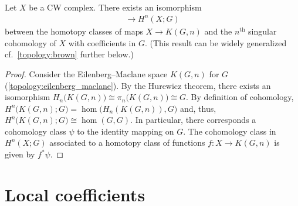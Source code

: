     \begin{property}[Representability]
        Let $X$ be a CW complex. There exists an isomorphism
        \begin{gather}
            [X,K(G,n)]\rightarrow H^n(X;G)
        \end{gather}
        between the homotopy classes of maps $X\rightarrow K(G,n)$ and the $n^{\text{th}}$ singular cohomology of $X$ with coefficients in $G$. (This result can be widely generalized cf.~\cref{topology:brown} further below.)
        \begin{mdframed}[roundcorner=10pt, linecolor=blue, linewidth=1pt]
            \begin{proof}
                Consider the Eilenberg--Maclane space $K(G,n)$ for $G$ (\cref{topology:eilenberg_maclane}). By the Hurewicz theorem, there exists an isomorphism $H_n\bigl(K(G,n)\bigr)\cong\pi_n\bigl(K(G,n)\bigr)\cong G$. By definition of cohomology, $H^n\bigl(K(G,n);G\bigr)=\hom\bigl(H_n(K(G,n)),G\bigr)$ and, thus, $H^n\bigl(K(G,n);G\bigr)\cong\hom(G,G)$. In particular, there corresponds a cohomology class $\psi$ to the identity mapping on $G$. The cohomology class in $H^n(X;G)$ associated to a homotopy class of functions $f:X\rightarrow K(G,n)$ is given by $f^*\psi$.
            \end{proof}
        \end{mdframed}
    \end{property}

\section{Local coefficients}\label{section:local_coefficients}

